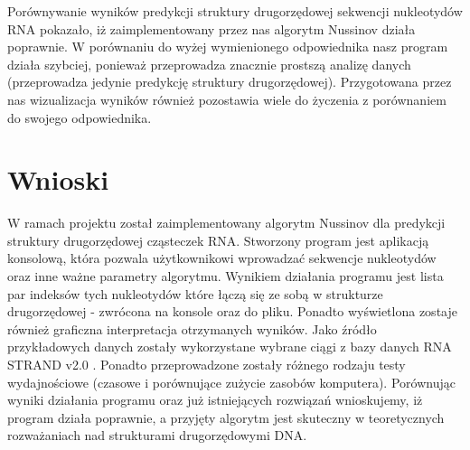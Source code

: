 \documentclass[paper=a4, fontsize=11pt]{scrartcl} %
\numberwithin{equation}{section} %
\numberwithin{figure}{section} %
\numberwithin{table}{section} %
\begin{document}
Porównywanie wyników predykcji struktury drugorzędowej sekwencji nukleotydów RNA pokazało, iż zaimplementowany przez nas algorytm Nussinov działa poprawnie. W porównaniu do wyżej wymienionego odpowiednika nasz program działa szybciej, ponieważ przeprowadza znacznie prostszą analizę danych (przeprowadza jedynie predykcję struktury drugorzędowej). Przygotowana przez nas wizualizacja wyników również pozostawia wiele do życzenia z porównaniem do swojego odpowiednika.


\section{Wnioski}

W ramach projektu został zaimplementowany algorytm Nussinov dla predykcji struktury drugorzędowej cząsteczek RNA. Stworzony program jest aplikacją konsolową, która pozwala użytkownikowi wprowadzać sekwencje nukleotydów oraz inne ważne parametry algorytmu. Wynikiem działania programu jest lista par indeksów tych nukleotydów które łączą się ze sobą w strukturze drugorzędowej - zwrócona na konsole oraz do pliku. Ponadto wyświetlona zostaje również graficzna interpretacja otrzymanych wyników. Jako źródło przykładowych danych zostały wykorzystane wybrane ciągi z bazy danych RNA STRAND v2.0 \cite{bib:baza}. Ponadto przeprowadzone zostały różnego rodzaju testy wydajnościowe (czasowe i porównujące zużycie zasobów komputera). Porównując wyniki działania programu oraz już istniejących rozwiązań wnioskujemy, iż program działa poprawnie, a przyjęty algorytm jest skuteczny w teoretycznych rozważaniach nad strukturami drugorzędowymi DNA.

\renewcommand{\refname}{\normalfont\selectfont\normalsize Literatura i źródła} 



\end{document}
